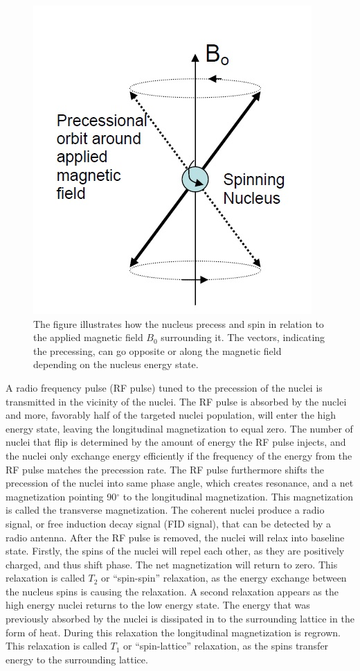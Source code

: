 \begin{figure}[H]                 
	\includegraphics[width=.375\textwidth]{figures/aBackground/nucleus_precess}  
	\caption{The figure illustrates how the nucleus precess and spin in relation to the applied magnetic field $B_0$ surrounding it. The vectors, indicating the precessing, can go opposite or along the magnetic field depending on the nucleus energy state. \cite{Edwards}}
	\label{fig:back:nucleus_precess} 
\end{figure}  
A radio frequency pulse (RF pulse) tuned to the precession of the nuclei is transmitted in the vicinity of the nuclei. The RF pulse is absorbed by the nuclei and more, favorably half of the targeted nuclei population, will enter the high energy state, leaving the longitudinal magnetization to equal zero. The number of nuclei that flip is determined by the amount of energy the RF pulse injects, and the nuclei only exchange energy efficiently if the frequency of the energy from the RF pulse matches the precession rate. The RF pulse furthermore shifts the precession of the nuclei into same phase angle, which creates resonance, and a net magnetization pointing 90$^\circ$ to the longitudinal magnetization. This magnetization is called the transverse magnetization. The coherent nuclei produce a radio signal, or free induction decay signal (FID signal), that can be detected by a radio antenna. 
After the RF pulse is removed, the nuclei will relax into baseline state. Firstly, the spins of the nuclei will repel each other, as they are positively charged, and thus shift phase. The net magnetization will return to zero. This relaxation is called $T_2$ or “spin-spin” relaxation, as the energy exchange between the nucleus spins is causing the relaxation. A second relaxation appears as the high energy nuclei returns to the low energy state. The energy that was previously absorbed by the nuclei is dissipated in to the surrounding lattice in the form of heat. During this relaxation the longitudinal magnetization is regrown. This relaxation is called $T_1$ or “spin-lattice” relaxation, as the spins transfer energy to the surrounding lattice. \cite{Bharath2008}
